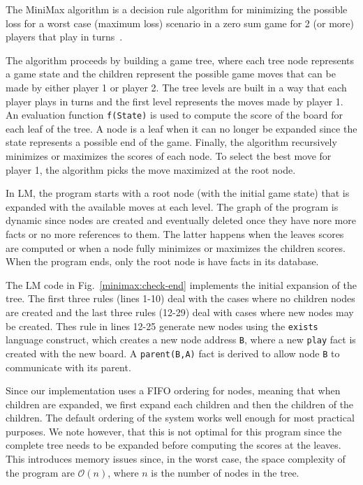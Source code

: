 The MiniMax algorithm is a decision rule algorithm for minimizing the
possible loss for a worst case (maximum loss) scenario in a zero sum
game for 2 (or more) players that play in
turns~\cite{Edwards54}.

The algorithm proceeds by building a game tree, where each tree node represents a
game state and the children represent the possible game moves that can
be made by either player 1 or player 2. The
tree levels are built in a way that each player plays in turns and the
first level represents the moves made by player 1.  An
evaluation function \texttt{f(State)} is used to compute the score of
the board for each leaf of the tree. A node is a leaf when it can no longer be
expanded since the state represents a possible end of the game.  Finally, the
algorithm recursively minimizes or maximizes the scores of each node.
To select the best move for player 1, the
algorithm picks the move maximized at the root node.

In LM, the program starts with a root node (with the initial game state)
that is expanded with the available moves at each level. The graph of the
program is dynamic since nodes are created and eventually deleted once they
have nore more facts or no more references to them. The latter happens when the
leaves scores are computed or when a node fully minimizes or maximizes the
children scores. When the program ends, only the root node is have facts in its
database.

The LM code in Fig.~\ref{minimax:check-end} implements
the initial expansion of the tree. The first three rules (lines 1-10) deal
with the cases where no children nodes are created and the last three rules
(12-29) deal with cases where new nodes may be created.
Thes rule in lines 12-25 generate new nodes using the
\texttt{exists} language construct, which creates a new node address
\texttt{B}, where a new \texttt{play} fact is created with the new
board. A \texttt{parent(B,A)} fact is derived to allow node \texttt{B} to
communicate with its parent.

Since our implementation
uses a FIFO ordering for nodes, meaning that when children are expanded, we
first expand each children and then the children of the children. The default
ordering of the system works well enough for most practical purposes. We note
however, that this is not optimal for this program since the complete tree needs
to be expanded before computing the scores at the leaves. This introduces memory
issues since, in the worst case, the space complexity of the program are
$\mathcal{O}(n)$, where $n$ is the number of nodes in the tree.

